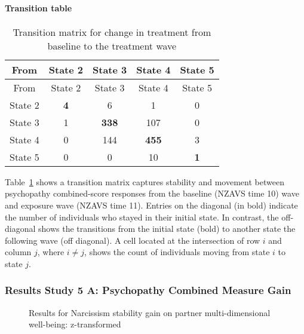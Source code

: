 \documentclass[
  singlecolumn]{article}
\let\oldparagraph\paragraph
\renewcommand{\paragraph}[1]{\oldparagraph{#1}\mbox{}}
\begin{document}
\paragraph{Transition table}\label{transition-table-4}

\begin{longtable}[]{@{}ccccc@{}}
\caption{Transition matrix for change in treatment from baseline to the
treatment wave}\label{tbl-transition-psychopathy}\tabularnewline
\toprule\noalign{}
From & State 2 & State 3 & State 4 & State 5 \\
\midrule\noalign{}
\endfirsthead
\toprule\noalign{}
From & State 2 & State 3 & State 4 & State 5 \\
\midrule\noalign{}
\endhead
\bottomrule\noalign{}
\endlastfoot
State 2 & \textbf{4} & 6 & 1 & 0 \\
State 3 & 1 & \textbf{338} & 107 & 0 \\
State 4 & 0 & 144 & \textbf{455} & 3 \\
State 5 & 0 & 0 & 10 & \textbf{1} \\
\end{longtable}

Table~\ref{tbl-transition-psychopathy} shows a transition matrix
captures stability and movement between psychopathy combined-score
responses from the baseline (NZAVS time 10) wave and exposure wave
(NZAVS time 11). Entries on the diagonal (in bold) indicate the number
of individuals who stayed in their initial state. In contrast, the
off-diagonal shows the transitions from the initial state (bold) to
another state the following wave (off diagonal). A cell located at the
intersection of row \(i\) and column \(j\), where \(i \neq j\), shows
the count of individuals moving from state \(i\) to state \(j\).

\subsubsection{Results Study 5 A: Psychopathy Combined Measure
Gain}\label{results-study-5-a-psychopathy-combined-measure-gain}

\begin{figure}


\caption{\label{fig-results-psychopathy-gain}Results for Narcissism
stability gain on partner multi-dimensional well-being: z-transformed}

\end{figure}%
\end{document}
